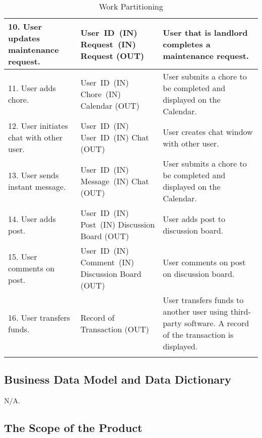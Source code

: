 \documentclass[12pt, titlepage]{article}
\begin{document}
\begin{longtable}{|p{5cm}|p{5cm}|p{5cm}|}
\hline
10. User updates maintenance request. & \mbox{User ID (IN)} \linebreak 
\mbox{Request (IN)} \linebreak Request (OUT) & User that is landlord completes a 
maintenance request. \\
\hline
11. User adds chore. & \mbox{User ID (IN)} \linebreak \mbox{Chore (IN)} 
\linebreak Calendar (OUT) & User submits a chore to be completed and displayed 
on the Calendar. \\
\hline
12. User initiates chat with other user. & \mbox{User ID (IN)} \linebreak 
\mbox{User ID (IN)} \linebreak Chat (OUT) & User creates chat window with other 
user. \\
\hline
13. User sends instant message. & \mbox{User ID (IN)} \linebreak \mbox{Message 
(IN)} \linebreak Chat (OUT) & User submits a chore to be completed and displayed 
on the Calendar. \\
\hline
14. User adds post. & \mbox{User ID (IN)} \linebreak \mbox{Post (IN)} \linebreak 
Discussion Board (OUT) & User adds post to discussion board. \\
\hline
15. User comments on post. & \mbox{User ID (IN)} \linebreak \mbox{Comment (IN)} 
\linebreak Discussion Board (OUT) & User comments on post on discussion board. 
\\
\hline
16. User transfers funds. & Record of Transaction (OUT) & User transfers funds 
to another user using third-party software. A record of the transaction is 
displayed. \\
\hline
\caption{Work Partitioning}
\end{longtable}

\subsection{Business Data Model and Data Dictionary}
N/A.

\subsection{The Scope of the Product}
\end{document}
